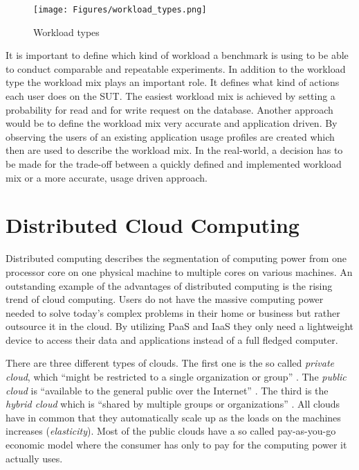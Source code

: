 \begin{figure}[h]
  \centering
  \texttt{[image: Figures/workload\_types.png]}
  \caption[Workload types]{Workload types \cite[2]{Schroeder.2006}}
  \label{fig:workload-types}
\end{figure}

It is important to define which kind of workload a benchmark is using to be able to conduct comparable and repeatable experiments. In addition to the workload type the workload mix plays an important role. It defines what kind of actions each user does on the \ac{SUT}. The easiest workload mix is achieved by setting a probability for read and for write request on the database. Another approach would be to define the workload mix very accurate and application driven. By observing the users of an existing application usage profiles are created which then are used to describe the workload mix. In the real-world, a decision has to be made for the trade-off between a quickly defined and implemented workload mix or a more accurate, usage driven approach.

\section{Distributed Cloud Computing}
\label{sec:distributed-computing}
Distributed computing describes the segmentation of computing power from one processor core on one physical machine to multiple cores on various machines. An outstanding example of the advantages of distributed computing is the rising trend of cloud computing. Users do not have the massive computing power needed to solve today's complex problems in their home or business but rather outsource it in the cloud. By utilizing \acf{PaaS} and \acf{IaaS} they only need a lightweight device to access their data and applications instead of a full fledged computer. \cite[1 - 2]{dikaiakos.2009}

There are three different types of clouds. The first one is the so called \emph{private cloud}, which \enquote{might be restricted to a single organization or group} \cite[2]{dikaiakos.2009}. The \emph{public cloud} is \enquote{available to the general public over the Internet} \cite[2]{dikaiakos.2009}. The third is the \emph{hybrid cloud} which is \enquote{shared by multiple groups or organizations} \cite[2]{dikaiakos.2009}. All clouds have in common that they automatically scale up as the loads on the machines increases (\emph{elasticity}). Most of the public clouds have a so called pay-as-you-go economic model where the consumer has only to pay for the computing power it actually uses. \cite[2]{dikaiakos.2009}


